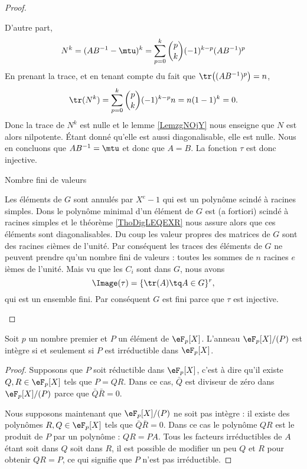 \begin{proof}
\begin{subproof}
            D'autre part, 
            \begin{equation}
                N^k=(AB^{-1}-\mtu)^k=\sum_{p=0}^k{p\choose k}(-1)^{k-p}(AB^{-1})^p
            \end{equation}
            En prenant la trace, et en tenant compte du fait que \( \tr\big( (AB^{-1})^p \big)=n\),
            \begin{equation}
                \tr(N^k)=\sum_{p=0}^k{p\choose k}(-1)^{k-p}n=n(1-1)^k=0.
            \end{equation}
            Donc la trace de \( N^k\) est nulle et le lemme \ref{LemzgNOjY} nous enseigne que \( N\) est alors nilpotente. Étant donné qu'elle est aussi diagonalisable, elle est nulle. Nous en concluons que \( AB^{-1}=\mtu\) et donc que \( A=B\). La fonction \( \tau\) est donc injective.

        \item[Nombre fini de valeurs]

            Les éléments de \( G\) sont annulés par \( X^e-1\) qui est un polynôme scindé à racines simples. Dons le polynôme minimal d'un élément de \( G\) est (a fortiori) scindé à racines simples et le théorème \ref{ThoDigLEQEXR} nous assure alors que ces éléments sont diagonalisables. Du coup les valeur propres des matrices de \( G\) sont des racines \( e\)ièmes de l'unité. Par conséquent les traces des éléments de \( G\) ne peuvent prendre qu'un nombre fini de valeurs : toutes les sommes de \( n\) racines \( e\)ièmes de l'unité. Mais vu que les \( C_i\) sont dans \( G\), nous avons
            \begin{equation}
                \Image(\tau)=\{ \tr(A)\tq A\in G \}^r,
            \end{equation}
            qui est un ensemble fini. Par conséquent \( G\) est fini parce que \( \tau\) est injective.
    \end{subproof}
\end{proof}


\begin{proposition} \label{PropleGdaT}
    Soit \( p\) un nombre premier et \( P\) un élément de \( \eF_p[X]\). L'anneau \( \eF_p[X]/(P)\) est intègre si et seulement si \( P\) est irréductible dans \( \eF_p[X]\).
\end{proposition}

\begin{proof}
    Supposons que \( P\) soit réductible dans \( \eF_p[X]\), c'est à dire qu'il existe \( Q,R\in \eF_p[X]\) tels que \( P=QR\). Dans ce cas, \( \bar Q\) est diviseur de zéro dans \( \eF_p[X]/(P)\) parce que \( \bar Q\bar R=0\).

    Nous supposons maintenant que \( \eF_p[X]/(P)\) ne soit pas intègre : il existe des polynômes \( R,Q\in \eF_p[X]\) tels que \( \bar Q\bar R=0\). Dans ce cas le polynôme \( QR\) est le produit de \( P\) par un polynôme : \( QR=PA\). Tous les facteurs irréductibles de \( A \) étant soit dans \( Q\) soit dans \( R\), il est possible de modifier un peu \( Q\) et \( R\) pour obtenir \( QR=P\), ce qui signifie que \( P\) n'est pas irréductible.
\end{proof}

